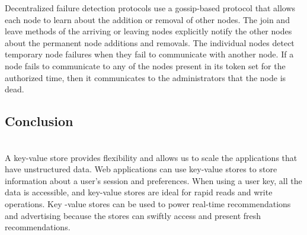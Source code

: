 Decentralized failure detection protocols use a gossip-based protocol that allows each node to learn about the addition or removal of other nodes. The join and leave methods of the arriving or leaving nodes explicitly notify the other nodes about the permanent node additions and removals. The individual nodes detect temporary node failures when they fail to communicate with another node. If a node fails to communicate to any of the nodes present in its token set for the authorized time, then it communicates to the administrators that the node is dead.

\subsection{Conclusion}\label{78TR2aZpIPaW2Mm5ZSHga}
\\
A key-value store provides flexibility and allows us to scale the applications that have unstructured data. Web applications can use key-value stores to store information about a user's session and preferences. When using a user key, all the data is accessible, and key-value stores are ideal for rapid reads and write operations. Key -value stores can be used to power real-time recommendations and advertising because the stores can swiftly access and present fresh recommendations.

